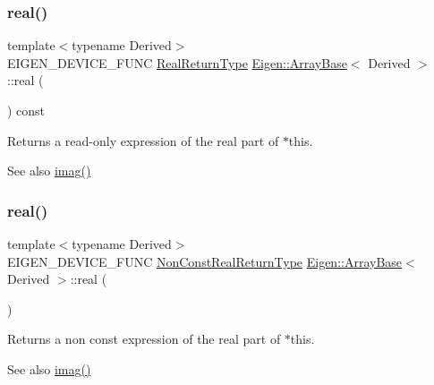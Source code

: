 \subsubsection{\texorpdfstring{real()}{real()}\hspace{0.1cm}{\footnotesize\ttfamily [1/2]}}
{\footnotesize\ttfamily template$<$typename Derived$>$ \\
E\+I\+G\+E\+N\+\_\+\+D\+E\+V\+I\+C\+E\+\_\+\+F\+U\+NC \mbox{\hyperlink{struct_eigen_1_1internal_1_1true__type}{Real\+Return\+Type}} \mbox{\hyperlink{class_eigen_1_1_array_base}{Eigen\+::\+Array\+Base}}$<$ Derived $>$\+::real (\begin{DoxyParamCaption}{ }\end{DoxyParamCaption}) const\hspace{0.3cm}{\ttfamily [inline]}}

\begin{DoxyReturn}{Returns}
a read-\/only expression of the real part of {\ttfamily $\ast$this}.
\end{DoxyReturn}
\begin{DoxySeeAlso}{See also}
\mbox{\hyperlink{class_eigen_1_1_array_base_a09aadb6a71f9293d19c638598a418c92}{imag()}} 
\end{DoxySeeAlso}
\mbox{\label{class_eigen_1_1_array_base_ab520a5e364380a10d471534c1e3d2253}} 
\subsubsection{\texorpdfstring{real()}{real()}\hspace{0.1cm}{\footnotesize\ttfamily [2/2]}}
{\footnotesize\ttfamily template$<$typename Derived$>$ \\
E\+I\+G\+E\+N\+\_\+\+D\+E\+V\+I\+C\+E\+\_\+\+F\+U\+NC \mbox{\hyperlink{struct_eigen_1_1internal_1_1true__type}{Non\+Const\+Real\+Return\+Type}} \mbox{\hyperlink{class_eigen_1_1_array_base}{Eigen\+::\+Array\+Base}}$<$ Derived $>$\+::real (\begin{DoxyParamCaption}{ }\end{DoxyParamCaption})\hspace{0.3cm}{\ttfamily [inline]}}

\begin{DoxyReturn}{Returns}
a non const expression of the real part of {\ttfamily $\ast$this}.
\end{DoxyReturn}
\begin{DoxySeeAlso}{See also}
\mbox{\hyperlink{class_eigen_1_1_array_base_a09aadb6a71f9293d19c638598a418c92}{imag()}} 
\end{DoxySeeAlso}
\mbox{\label{class_eigen_1_1_array_base_a354b5032ab3852a015a55b4dbf257d3d}} 

